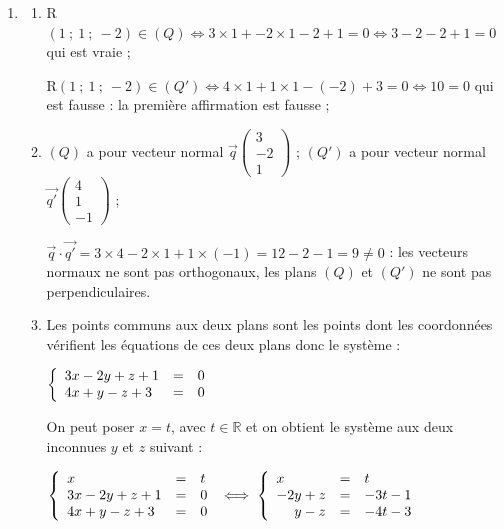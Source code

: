 \documentclass[10pt]{article}
\providecommand{\R}{\mathbb{R}}
\providecommand{\vect}[1]{\overrightarrow{#1}}
\begin{document}
\begin{enumerate}
Ce système n'a pas de solution. Donc le point D n'appartient pas au plan défini par les points A, B et C ou encore A, B, C et D ne sont pas coplanaires.

\item 
	\begin{enumerate}
		\item 
R$(1~;~1~;~-2) \in (Q) \iff 3 \times 1 + -2  \times1  - 2 +1 = 0 \iff 3 - 2 - 2 + 1 = 0$ qui est vraie ;
		
R$(1~;~1~;~-2) \in (Q') \iff 4 \times 1 + 1 \times 1  - (- 2) + 3 = 0 \iff 10 = 0$ qui est fausse : la première affirmation est fausse ;
		\item 
$(Q)$ a pour vecteur normal $\vect{q}\begin{pmatrix}3\\- 2\\1\end{pmatrix}$ ; 
$(Q')$ a pour vecteur normal $\vect{q'}\begin{pmatrix}4\\1\\- 1\end{pmatrix}$ ; 

$\vect{q} \cdot \vect{q'} = 3 \times  4 -2 \times  1 + 1 \times (-1) = 12 - 2 - 1 = 9 \ne 0$ : les vecteurs normaux ne sont pas orthogonaux, les plans $(Q)$ et $(Q')$ ne sont pas perpendiculaires.
		\item 






Les points communs aux deux plans sont les points dont les coordonnées vérifient les équations de ces deux plans donc le système :

$\left\{\begin{array}{l cl}
3x - 2y + z + 1 &=& 0\\
4x + y - z + 3 &=& 0
\end{array}\right.$

On peut poser $x = t$, avec $t \in \R$ et on obtient le système aux deux inconnues $y$ et $z$ suivant :

$\left\{\begin{array}{l cl}
x&=&t\\
3x - 2y + z + 1 &=& 0\\
4x + y - z + 3 &=& 0
\end{array}\right. \iff \left\{\begin{array}{l cl}
x&=&t\\
-2y + z &=& - 3t - 1\\
\phantom{- 2}y - z &=& - 4t - 3
\end{array}\right. $


\end{enumerate}
\end{enumerate}
\end{document}
